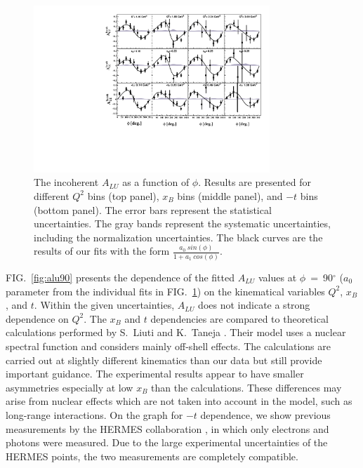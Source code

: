 \documentclass[twocolumn,nofootinbib,showpacs,prl,superscriptaddress,secnumarabic,amssymb,nobibnotes,aps,floatfix]{revtex4}
\begin{document}
\begin{figure}[tb]
\includegraphics[width=8.9cm]{figs/incoherent_ALU_phi.pdf}
\caption{The incoherent $A_{LU}$ as a function of $\phi$. Results are presented
   for different $Q^{2}$ bins (top panel), $x_{B}$ bins (middle panel), and 
   $-t$ bins (bottom panel). The error bars represent the statistical 
   uncertainties. The gray bands represent the systematic uncertainties, 
   including the normalization uncertainties. The black curves are the results 
   of our fits with the form $\frac{a_{0}~sin(\phi)}{1+ a_{1}~cos(\phi)}$.}
\label{fig:alu}
\end{figure}


FIG.~\ref{fig:alu90} presents the dependence of the fitted $A_{LU}$ values at 
$\phi$~=~90$^{\circ}$ ($a_{0}$ parameter from the individual fits in 
FIG.~\ref{fig:alu}) on the kinematical variables $Q^2$, $x_{B}$, and $t$.  
Within the given uncertainties, $A_{LU}$ does not indicate a strong dependence 
on $Q^2$.  The $x_{B}$ and $t$ dependencies are compared to theoretical 
calculations performed by S.~Liuti and K.~Taneja \cite{simonetta_2}. Their 
model uses a nuclear spectral function and considers mainly off-shell effects.  
The calculations are carried out at slightly different kinematics than our data 
but still provide important guidance. The experimental results appear to have 
smaller asymmetries especially at low $x_{B}$ than the calculations. These 
differences may arise from nuclear effects which are not taken into account in 
the model, such as long-range interactions.  On the graph for $-t$ dependence, 
we show previous measurements by the HERMES collaboration 
\cite{Airapetian:2009cga}, in which only electrons
and photons were measured. Due to the large experimental uncertainties of the HERMES 
points, the two measurements are completely compatible. 
\end{document}

